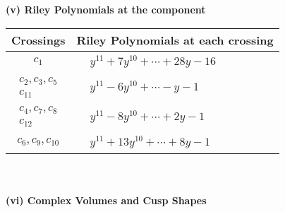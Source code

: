 \documentclass[1p]{elsarticle_modified}
\theoremstyle{definition}
\begin{document}
\newpage\renewcommand{\arraystretch}{1}
\flushleft \textbf{(v) Riley Polynomials at the component}\newline \\
\begin{tabular}{m{50pt}|m{274pt}}
Crossings & \hspace{64pt}Riley Polynomials at each crossing \\
\hline $$\begin{aligned}c_{1}\end{aligned}$$&$\begin{aligned}
&y^{11}+7 y^{10}+\cdots+28 y-16
\end{aligned}$\\
\hline $$\begin{aligned}c_{2},c_{3},c_{5}\\c_{11}\end{aligned}$$&$\begin{aligned}
&y^{11}-6 y^{10}+\cdots- y-1
\end{aligned}$\\
\hline $$\begin{aligned}c_{4},c_{7},c_{8}\\c_{12}\end{aligned}$$&$\begin{aligned}
&y^{11}-8 y^{10}+\cdots+2 y-1
\end{aligned}$\\
\hline $$\begin{aligned}c_{6},c_{9},c_{10}\end{aligned}$$&$\begin{aligned}
&y^{11}+13 y^{10}+\cdots+8 y-1
\end{aligned}$\\
\hline
\end{tabular}\\~\\
\newpage\flushleft \textbf{(vi) Complex Volumes and Cusp Shapes}
\end{document}
